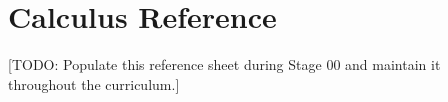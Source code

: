 
\section*{Calculus Reference}

[TODO: Populate this reference sheet during Stage 00 and maintain it throughout the curriculum.]
